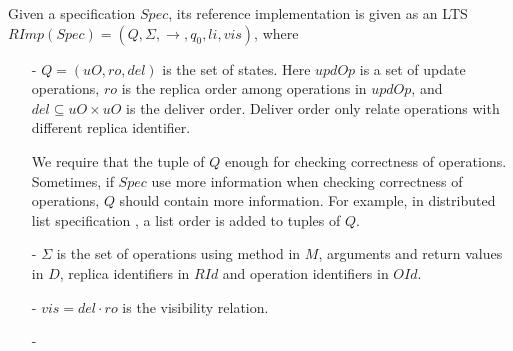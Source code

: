
Given a specification $Spec$, its reference implementation is given as an LTS $RImp(Spec) = (Q,\Sigma,\rightarrow,q_0,li,vis)$, where 

\begin{itemize}
\setlength{\itemsep}{0.5pt}
\item[-] $Q = (uO,ro,del)$ is the set of states. Here $updOp$ is a set of update operations, $ro$ is the replica order among operations in $updOp$, and $del \subseteq uO \times uO$ is the deliver order. Deliver order only relate operations with different replica identifier. 
    
    We require that the tuple of $Q$ enough for checking correctness of operations. Sometimes, if $Spec$ use more information when checking correctness of operations, $Q$ should contain more information. For example, in distributed list specification \cite{Attiya:2016}, a list order is added to tuples of $Q$. 
    
\item[-] $\Sigma$ is the set of operations using method in $M$, arguments and return values in $D$, replica identifiers in $RId$ and operation identifiers in $OId$. 

\item[-] $vis = del \cdot ro$ is the visibility relation. 

\item[-] 
\end{itemize}








